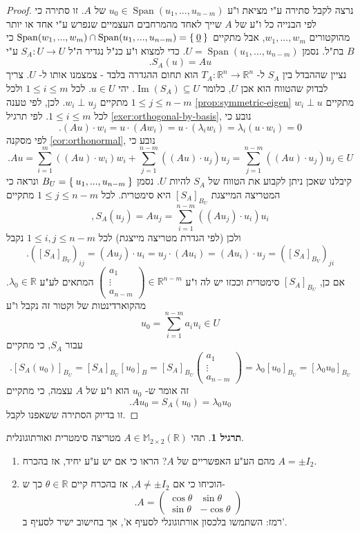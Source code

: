 \documentclass[12pt]{report}
\theoremstyle{plain}
\theoremstyle{definition}
\newtheorem{exercise}{תרגיל}[chapter]
\newcommand{\R}{\mathbb{R}}
\newcommand{\M}{\mathbb{M}}
\newcommand{\0}{\mathbf{0}}
\DeclareMathOperator{\Span}{Span}
\DeclareMathOperator{\Image}{Im}
\begin{document}
\begin{proof}
נרצה לקבל סתירה ע"י מציאת ו"ע 
$u_0\in\Span(u_1,...,u_{n-m})$
של
$A$.
זו סתירה כי לפי הבנייה כל ו"ע של 
$A$
שייך לאחד מהמרחבים העצמיים שנפרש ע"י אחד או יותר מהוקטורים
$w_1,...,w_m$,
אבל מתקיים
$\Span(w_1,...,w_m)\cap\Span(u_1,...,u_{n-m})=\Set{\underline{0}}$
כי 
$B$
בת"ל.
נסמן
$U=\Span(u_1,...,u_{n-m})$.
כדי למצוא ו"ע כנ"ל נגדיר ה"ל 
$S_A:U\to U$
ע"י
$$
.S_A(u)=Au
$$
נציין שההבדל בין 
$S_A$
ל-
$T_A:\R^n\to \R^n$
הוא תחום ההגדרה בלבד - צמצמנו אותו ל-
$U$.
צריך לבדוק שהטווח הוא אכן
$U$,
כלומר
$\Image(S_A)\subseteq U$.
יהי
$u\in U$.
לכל
$1\leq i\leq m$
ולכל
$1\leq j\leq n-m$
מתקיים
$w_i\perp u_j$.
לכן, לפי טענה
\ref{prop:symmetric-eigen}
מתקיים
$w_i\perp u$
לכל 
$1\leq i\leq m$.
לפי תרגיל
\ref{exer:orthogonal-by-basis},
נובע כי
$$
.(Au)\cdot w_i=u\cdot (Aw_i)=u\cdot (\lambda_iw_i)=\lambda_i(u\cdot w_i)=0
$$
לפי מסקנה
\ref{cor:orthonormal},
נובע כי
$$
.Au=\sum_{i=1}^m\left((Au)\cdot w_i\right)w_i+\sum_{j=1}^{n-m}\left((Au)\cdot u_j\right)u_j=\sum_{j=1}^{n-m}\left((Au)\cdot u_j\right)u_j\in U
$$
קיבלנו שאכן ניתן לקבוע את הטווח של
$S_A$
להיות 
$U$. 
נסמן
$B_U=\Set{u_1,...,u_{n-m}}$
ונראה כי המטריצה המייצגת 
$[S_A]_{B_U}$
היא סימטרית. 
לכל
$1\leq j\leq n-m$
מתקיים
$$
,S_A(u_j)=Au_j=\sum_{i=1}^{n-m}\left((Au_j)\cdot u_i\right)u_i
$$
ולכן (לפי הגדרת מטריצה מייצגת) לכל 
$1\leq i,j\leq n-m$
נקבל
$$
.([S_A]_{B_V})_{ij}=(Au_j)\cdot u_i=u_j\cdot (Au_i)=(Au_i)\cdot u_j=([S_A]_{B_V})_{ji}
$$
אם כן,
$[S_A]_{B_U}$
סימטרית וככזו יש לה ו"ע
$\begin{pmatrix}a_1\\\vdots\\a_{n-m}\end{pmatrix}\in\R^{n-m}$
המתאים לע"ע
$\lambda_0\in\R$.
מהקוארדינטות של וקטור זה נקבל ו"ע
$$
u_0=\sum_{i=1}^{n-m}a_iu_i\in U
$$
עבור 
$S_A$,
כי מתקיים
$$
.[S_A(u_0)]_{B_U}=[S_A]_{B_U}[u_0]_B=[S_A]_{B_U}\begin{pmatrix}a_1\\\vdots\\a_{n-m}\end{pmatrix}=\lambda_0[u_0]_{B_U}=[\lambda_0u_0]_{B_U}
$$
זה אומר ש-
$u_0$
הוא ו"ע של
$A$
עצמה, כי מתקיים
$$
.Au_0=S_A(u_0)=\lambda_0 u_0
$$
זו בדיוק הסתירה ששאפנו לקבל.

\end{proof}

\begin{exercise}
תהי
$A\in\M_{2\times 2}(\R)$
מטריצה סימטרית ואורתוגונלית.
\begin{enumerate}[label=\alph*.]
\item 
מהם הע"ע האפשריים של
$A$?
הראו כי אם יש ע"ע יחיד, אז בהכרח
$A=\pm I_2$.


\item
הוכיחו כי אם
$A\neq\pm I_2$,
אז בהכרח קיים
$\theta\in\R$
כך ש-
$$
.A=\begin{pmatrix}
\cos\theta & \sin\theta \\
\sin\theta & -\cos\theta
\end{pmatrix}
$$
רמז: השתמשו בלכסון אורתוגונלי לסעיף א', אך בחישוב ישיר לסעיף ב'.


\end{enumerate}
\end{exercise}
\end{document}

